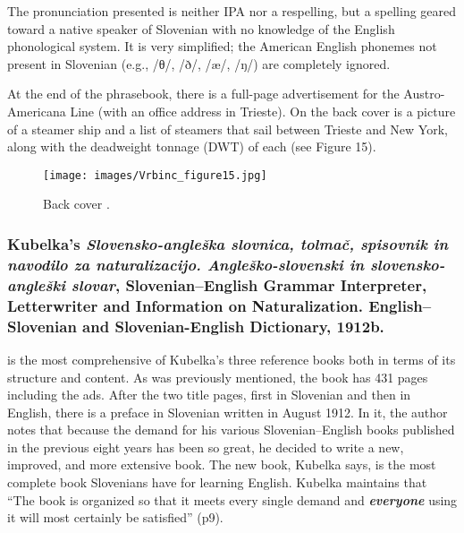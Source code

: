 \documentclass[output=paper,colorlinks,citecolor=brown,arabicfont,chinesefont]{langscibook}
\begin{document}
The pronunciation presented is neither IPA nor a respelling, but a spelling geared toward a native speaker of Slovenian with no knowledge of the English phonological system. It is very simplified; the American English phonemes not present in Slovenian (e.g., /θ/, /ð/, /æ/, /ŋ/) are completely ignored. 

At the end of the phrasebook, there is a full-page advertisement for the Austro-Americana Line (with an office address in Trieste). On the back cover is a picture of a steamer ship and a list of steamers that sail between Trieste and New York, along with the deadweight tonnage (DWT) of each (see Figure 15).

\begin{figure}
\texttt{[image: images/Vrbinc\_figure15.jpg]}
\caption{Back cover \citep{Kubelka1912a}.}
\label{Figure 15}
\end{figure}

\subsubsection{Kubelka’s \emph{Slovensko-angleška slovnica, tolmač, spisovnik in navodilo za naturalizacijo. Angleško-slovenski in slovensko-angleški slovar}, Slovenian–English Grammar Interpreter, Letterwriter and Information on Naturalization. English–Slovenian and Slovenian-English Dictionary, 1912b.}

\citet{Kubelka1912b} is the most comprehensive of Kubelka’s three reference books both in terms of its structure and content. As was previously mentioned, the book has 431 pages including the ads. After the two title pages, first in Slovenian and then in English, there is a preface in Slovenian written in August 1912. In it, the author notes that because the demand for his various Slovenian–English books published in the previous eight years has been so great, he decided to write a new, improved, and more extensive book. The new book, Kubelka says, is the most complete book Slovenians have for learning English. Kubelka maintains that “The book is organized so that it meets every single demand and \textbf{\emph{everyone}} using it will most certainly be satisfied” (p9).
\end{document}
